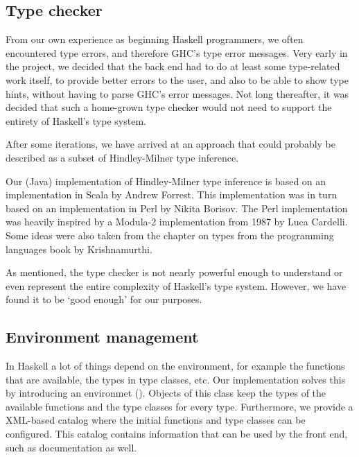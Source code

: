 \subsection{Type checker}

From our own experience as beginning Haskell programmers, we often encountered type errors, and therefore GHC's type error messages.
Very early in the project, we decided that the back end had to do at least some type-related work itself, to provide better errors to the user, and also to be able to show type hints, without having to parse GHC's error messages.
Not long thereafter, it was decided that such a home-grown type checker would not need to support the entirety of Haskell's type system.

After some iterations, we have arrived at an approach that could probably be described as a subset of Hindley-Milner type inference.  

Our (Java) implementation of Hindley-Milner type inference is based on an implementation in Scala by Andrew Forrest\cite{forrest}.
This implementation was in turn based on an implementation in Perl by Nikita Borisov\cite{borisov}.
The Perl implementation was heavily inspired by a Modula-2 implementation from 1987 by Luca Cardelli\cite{cardelli}.
Some ideas were also taken from the chapter on types from the programming languages book by Krishnamurthi\cite{plai}.

As mentioned, the type checker is not nearly powerful enough to understand or even represent the entire complexity of Haskell's type system.
However, we have found it to be `good enough' for our purposes.

\subsection{Environment management}

In Haskell a lot of things depend on the environment, for example the functions that are available, the types in type classes, etc.
Our implementation solves this by introducing an environmet ().
Objects of this class keep the types of the available functions and the type classes for every type.
Furthermore, we provide a XML-based catalog where the initial functions and type classes can be configured.
This catalog contains information that can be used by the front end, such as documentation as well.
